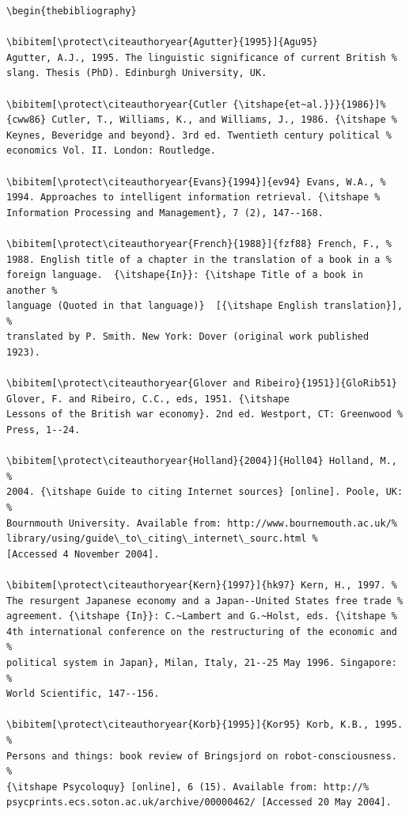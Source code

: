 \documentclass[]{cJEN2e}
\begin{document}
\begin{verbatim}
\begin{thebibliography}

\bibitem[\protect\citeauthoryear{Agutter}{1995}]{Agu95}
Agutter, A.J., 1995. The linguistic significance of current British %
slang. Thesis (PhD). Edinburgh University, UK.

\bibitem[\protect\citeauthoryear{Cutler {\itshape{et~al.}}}{1986}]%
{cww86} Cutler, T., Williams, K., and Williams, J., 1986. {\itshape %
Keynes, Beveridge and beyond}. 3rd ed. Twentieth century political %
economics Vol. II. London: Routledge.

\bibitem[\protect\citeauthoryear{Evans}{1994}]{ev94} Evans, W.A., %
1994. Approaches to intelligent information retrieval. {\itshape %
Information Processing and Management}, 7 (2), 147--168.

\bibitem[\protect\citeauthoryear{French}{1988}]{fzf88} French, F., %
1988. English title of a chapter in the translation of a book in a %
foreign language.  {\itshape{In}}: {\itshape Title of a book in another %
language (Quoted in that language)}  [{\itshape English translation}], %
translated by P. Smith. New York: Dover (original work published 1923).

\bibitem[\protect\citeauthoryear{Glover and Ribeiro}{1951}]{GloRib51}
Glover, F. and Ribeiro, C.C., eds, 1951. {\itshape
Lessons of the British war economy}. 2nd ed. Westport, CT: Greenwood %
Press, 1--24.

\bibitem[\protect\citeauthoryear{Holland}{2004}]{Holl04} Holland, M., %
2004. {\itshape Guide to citing Internet sources} [online]. Poole, UK: %
Bournmouth University. Available from: http://www.bournemouth.ac.uk/%
library/using/guide\_to\_citing\_internet\_sourc.html %
[Accessed 4 November 2004].

\bibitem[\protect\citeauthoryear{Kern}{1997}]{hk97} Kern, H., 1997. %
The resurgent Japanese economy and a Japan--United States free trade %
agreement. {\itshape {In}}: C.~Lambert and G.~Holst, eds. {\itshape %
4th international conference on the restructuring of the economic and %
political system in Japan}, Milan, Italy, 21--25 May 1996. Singapore: %
World Scientific, 147--156.

\bibitem[\protect\citeauthoryear{Korb}{1995}]{Kor95} Korb, K.B., 1995. %
Persons and things: book review of Bringsjord on robot-consciousness. %
{\itshape Psycoloquy} [online], 6 (15). Available from: http://%
psycprints.ecs.soton.ac.uk/archive/00000462/ [Accessed 20 May 2004].


\end{verbatim}
\end{document}
